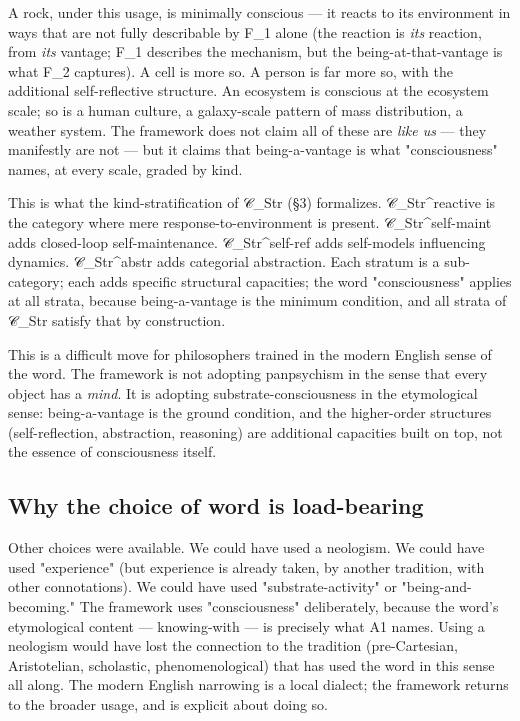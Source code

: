 \documentclass[11pt, openany]{book}
\begin{document}
A rock, under this usage, is minimally conscious --- it reacts to its environment in ways that are not fully describable by F\_\allowbreak{}1 alone (the reaction is \textit{its} reaction, from \textit{its} vantage; F\_\allowbreak{}1 describes the mechanism, but the being-at-that-vantage is what F\_\allowbreak{}2 captures). A cell is more so. A person is far more so, with the additional self-reflective structure. An ecosystem is conscious at the ecosystem scale; so is a human culture, a galaxy-scale pattern of mass distribution, a weather system. The framework does not claim all of these are \textit{like us} --- they manifestly are not --- but it claims that being-a-vantage is what "consciousness" names, at every scale, graded by kind.

This is what the kind-stratification of 𝒞\_\allowbreak{}Str (§3) formalizes. 𝒞\_\allowbreak{}Str\textasciicircum{}reactive is the category where mere response-to-environment is present. 𝒞\_\allowbreak{}Str\textasciicircum{}self-maint adds closed-loop self-maintenance. 𝒞\_\allowbreak{}Str\textasciicircum{}self-ref adds self-models influencing dynamics. 𝒞\_\allowbreak{}Str\textasciicircum{}abstr adds categorial abstraction. Each stratum is a sub-category; each adds specific structural capacities; the word "consciousness" applies at all strata, because being-a-vantage is the minimum condition, and all strata of 𝒞\_\allowbreak{}Str satisfy that by construction.

This is a difficult move for philosophers trained in the modern English sense of the word. The framework is not adopting panpsychism in the sense that every object has a \textit{mind}. It is adopting substrate-consciousness in the etymological sense: being-a-vantage is the ground condition, and the higher-order structures (self-reflection, abstraction, reasoning) are additional capacities built on top, not the essence of consciousness itself.

\subsection{Why the choice of word is load-bearing}

Other choices were available. We could have used a neologism. We could have used "experience" (but experience is already taken, by another tradition, with other connotations). We could have used "substrate-activity" or "being-and-becoming." The framework uses "consciousness" deliberately, because the word's etymological content --- knowing-with --- is precisely what A1 names. Using a neologism would have lost the connection to the tradition (pre-Cartesian, Aristotelian, scholastic, phenomenological) that has used the word in this sense all along. The modern English narrowing is a local dialect; the framework returns to the broader usage, and is explicit about doing so.
\end{document}
